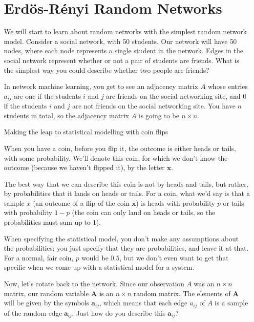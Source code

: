 \section{Erd\"os-R\'enyi Random Networks}
\label{sec:ch5:er}


We will start to learn about random networks with the simplest random network model. Consider a social network, with 50 students. Our network will have 50 nodes, where each node represents a single student in the network. Edges in the social network represent whether or not a pair of students are friends. What is the simplest way you could describe whether two people are friends?

In network machine learning, you get to see an adjacency matrix $A$ whose entries $a_{ij}$ are one if the students $i$ and $j$ are friends on the social networking site, and $0$ if the students $i$ and $j$ are not friends on the social networking site. You have $n$ students in total, so the adjacency matrix $A$ is going to be $n \times n$. 

\begin{floatingbox}[h]\caption{Making the leap to statistical modelling with coin flips}
When you have a coin, before you flip it, the outcome is either heads or tails, with some probability. We'll denote this coin, for which we don't know the outcome (because we haven't flipped it), by the letter $\mathbf x$. 

The best way that we can describe this coin is not by heads and tails, but rather, by {probabilities} that it lands on heads or tails. For a coin, what we'd say is that a sample $x$ (an outcome of a flip of the coin $\mathbf x$) is heads with probability $p$ or tails with probability $1-p$ (the coin can only land on heads or tails, so the probabilities must sum up to $1$). 

When specifying the statistical model, you don't make any assumptions about the probabilities; you just specify that they are probabilities, and leave it at that. For a normal, {fair} coin, $p$ would be $0.5$, but we don't even want to get that specific when we come up with a statistical model for a system.
\end{floatingbox}

Now, let's rotate back to the network. Since our observation $A$ was an $n \times n$ matrix, our random variable $\mathbf A$ is an $n \times n$ random matrix. The elements of $\mathbf A$ will be given by the symbols $\mathbf a_{ij}$, which means that each edge $a_{ij}$ of $A$ is a sample of the random edge $\mathbf a_{ij}$. Just how do you describe this $\mathbf a_{ij}$? 

